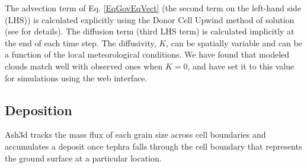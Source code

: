 The advection term of Eq. \ref{EqGovEqVect} (the second term on the left-hand side
(LHS)) is calculated explicitly using the Donor Cell Upwind method of
solution (see \cite{Schwaiger12} for details). The diffusion term (third
LHS term) is calculated implicitly at the end of each time step. The diffusivity,
$K$, can be spatially variable and can be a function of the local meteorological
conditions. We have found that modeled clouds match well with observed ones
when $K=0$, and have set it to this value for simulations using the web interface.

\subsection{Deposition}\label{ChapIntroSecDepo}
Ash3d tracks the mass flux of each grain size across cell boundaries and
accumulates a deposit once tephra falls through the cell boundary that
represents the ground surface at a particular location.

